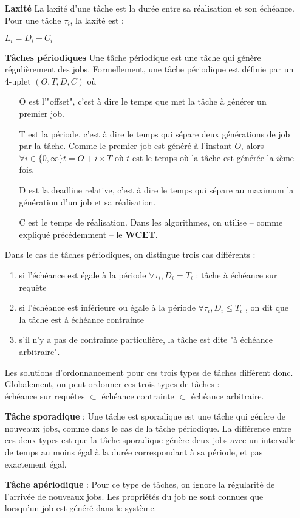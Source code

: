\documentclass[11pt,a4paper,oneside]{report}
\begin{document}
\begin{itemize}
	\item[\textbf{Laxité}] La laxité d'une tâche est la durée entre sa réalisation et son échéance. 
	Pour une tâche $\tau_i$, la laxité est :
	\begin{center}
		$L_i = D_i - C_i$
	\end{center}
\vspace{0.5cm}
	\item[\textbf{Tâches périodiques}]
	Une tâche périodique est une tâche qui génère régulièrement des jobs.  
Formellement, une tâche périodique est définie par un 4-uplet $(O, T, D, C)$ où 
\begin{itemize}
	\item[O] est l'"offset", c'est à dire le temps que met la tâche à générer un premier job.
	\item[T] est la période, c'est à dire le temps qui sépare deux générations de job par la tâche. 
	Comme le premier job est généré à l'instant $O$, alors $\forall i \in \{0, \infty \} t = O + i\times T$ 
	où $t$ est le temps où la tâche est générée la $i$ème fois.
	\item[D] est la deadline relative, c'est à dire le temps qui sépare au maximum la génération 
	d'un job et sa réalisation.
	\item[C] est le temps de réalisation. Dans les algorithmes, on utilise -- comme expliqué précédemment --
	le \textbf{WCET}.
\end{itemize}	
	Dans le cas de tâches périodiques, on distingue trois cas différents : \\
	\begin{enumerate}
		\item si l'échéance est égale à la période $\forall \tau_i, D_i = T_i$ : tâche à \label{echeancesurrequete}échéance sur requête
		\item si l'échéance est inférieure ou égale à la période $\forall \tau_i, D_i \leq T_i $ , on dit que la tâche est à \label{echeancecontrainte} échéance contrainte
		\item s'il n'y a pas de contrainte particulière, la tâche est dite "à échéance arbitraire".
	\end{enumerate}
	Les solutions d'ordonnancement pour ces trois types de tâches diffèrent donc. 
	Globalement, on peut ordonner ces trois types de tâches : \\
	échéance sur requêtes $\subset$ échéance contrainte $\subset$ échéance arbitraire.
	
	\item[\textbf{Tâche sporadique}] : Une tâche est sporadique est une tâche qui génère de nouveaux jobs, 
	comme dans le cas de la tâche périodique. 
	La différence entre ces deux types est que la tâche sporadique 
	génère deux jobs avec un intervalle de temps au moins égal à la durée correspondant à sa période, 
	et pas exactement égal. 
	
	\item[\textbf{Tâche apériodique}] : Pour ce type de tâches, on ignore la régularité de 
	l'arrivée de nouveaux jobs. Les propriétés du job ne sont connues que lorsqu'un job est 
	généré dans le système.
	
\end{itemize}
\end{document}
